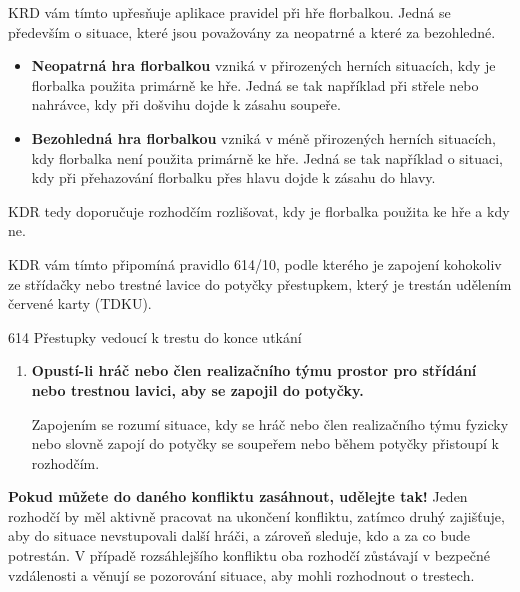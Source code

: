 \documentclass{newsletter}
\begin{document}
KRD vám tímto upřesňuje aplikace pravidel při hře florbalkou. Jedná se především o situace, které jsou považovány za neopatrné a které za bezohledné.

\begin{itemize}
	\item \textbf{Neopatrná hra florbalkou} vzniká v přirozených herních situacích, kdy je florbalka použita primárně ke hře. Jedná se tak například při střele nebo nahrávce, kdy při došvihu dojde k zásahu soupeře.
	\item \textbf{Bezohledná hra florbalkou} vzniká v méně přirozených herních situacích, kdy florbalka není použita primárně ke hře. Jedná se tak například o situaci, kdy při přehazování florbalku přes hlavu dojde k zásahu do hlavy.
\end{itemize}

KDR tedy doporučuje rozhodčím rozlišovat, kdy je florbalka použita ke hře a kdy ne.

\clearpage
{}
KDR vám tímto připomíná pravidlo 614/10, podle kterého je zapojení kohokoliv ze střídačky nebo trestné lavice do potyčky přestupkem, který je trestán udělením červené karty (TDKU).

\begin{admonition-quote}{614 Přestupky vedoucí k trestu do konce utkání}
	\begin{enumerate}\addtocounter{enumi}{9}
		\item \textbf{Opustí-li hráč nebo člen realizačního týmu prostor pro střídání nebo trestnou lavici, aby se zapojil do potyčky.}
		
		\begin{flushleft}
			Zapojením se rozumí situace, kdy se hráč nebo člen realizačního týmu fyzicky nebo slovně zapojí do potyčky se
			soupeřem nebo během potyčky přistoupí k rozhodčím.
		\end{flushleft}
	\end{enumerate}
\end{admonition-quote}

\textbf{Pokud můžete do daného konfliktu zasáhnout, udělejte tak!} Jeden rozhodčí by měl aktivně pracovat na ukončení konfliktu, zatímco druhý zajišťuje, aby do situace nevstupovali další hráči, a zároveň sleduje, kdo a za co bude potrestán. V případě rozsáhlejšího konfliktu oba rozhodčí zůstávají v bezpečné vzdálenosti a věnují se pozorování situace, aby mohli rozhodnout o trestech. 
\end{document}
